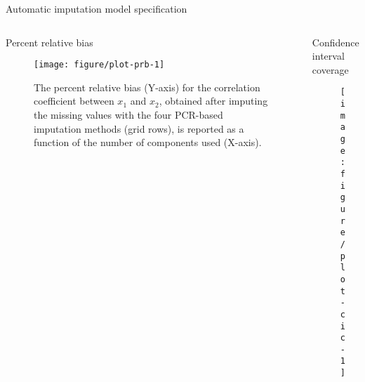 \documentclass{beamer}\usepackage[]{graphicx}\usepackage[]{xcolor}
\makeatletter
\def\maxwidth{ %
  \ifdim\Gin@nat@width>\linewidth
    \linewidth
  \else
    \Gin@nat@width
  \fi
}
\newenvironment{knitrout}{}{} %
\makeatother
\begin{document}
\begin{frame}[fragile]
\begin{columns}[T]
\begin{column}{.42\textwidth}
\begin{block}{Automatic imputation model specification}
\end{block}

\end{column}

\end{columns}

\bigskip
{\hrulefill}
\bigskip


\begin{columns}


  \begin{column}{.46\textwidth}
    \begin{block}{Percent relative bias}

      \begin{figure}
        \centering
\begin{knitrout}
\color{fgcolor}

{\centering \texttt{[image: figure/plot-prb-1]} 

}


\end{knitrout}
          \caption{
            \label{fig:prb-text} 
            The percent relative bias (Y-axis) for the correlation coefficient between $x_1$ and $x_2$, obtained after imputing the missing values with the four PCR-based imputation methods (grid rows), is reported as a function of the number of components used (X-axis).
            }
        \end{figure}
        
    \end{block}
    
  \end{column}  


  \begin{column}{.46\textwidth}

    \begin{block}{Confidence interval coverage}
      
      \begin{figure}
        \centering
\begin{knitrout}
\color{fgcolor}

{\centering \texttt{[image: figure/plot-cic-1]} 

}
\end{knitrout}
\end{figure}
\end{block}
\end{column}
\end{columns}
\end{frame}
\end{document}
